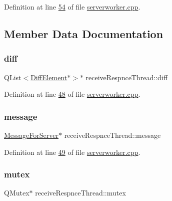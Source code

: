 Definition at line \hyperlink{a00107_source_l00054}{54} of file \hyperlink{a00107_source}{serverworker.\+cpp}.



\subsection{Member Data Documentation}
\mbox{\label{a00221_a77d9cc109e9ebeb4f55d5b753621d0f1}} 
\subsubsection{\texorpdfstring{diff}{diff}}
{\footnotesize\ttfamily Q\+List$<$\hyperlink{a00141}{Diff\+Element}$\ast$$>$$\ast$ receive\+Respnce\+Thread\+::diff}



Definition at line \hyperlink{a00107_source_l00048}{48} of file \hyperlink{a00107_source}{serverworker.\+cpp}.

\mbox{\label{a00221_aa3512ecc40fc7e23890c11c08ea4838c}} 
\subsubsection{\texorpdfstring{message}{message}}
{\footnotesize\ttfamily \hyperlink{a00121}{Message\+For\+Server}$\ast$ receive\+Respnce\+Thread\+::message}



Definition at line \hyperlink{a00107_source_l00049}{49} of file \hyperlink{a00107_source}{serverworker.\+cpp}.

\mbox{\label{a00221_a1945dd1b371f3efa9a07df815c868f96}} 
\subsubsection{\texorpdfstring{mutex}{mutex}}
{\footnotesize\ttfamily Q\+Mutex$\ast$ receive\+Respnce\+Thread\+::mutex}



